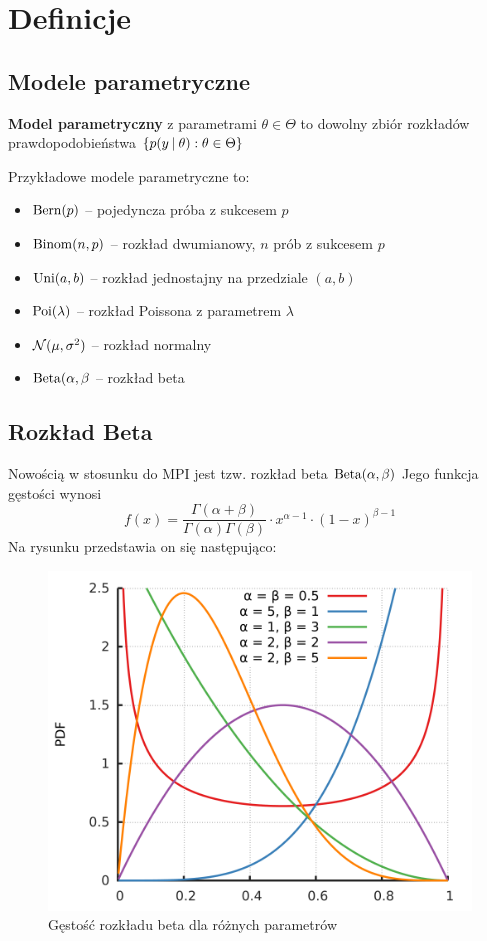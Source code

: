 \section{Definicje}

\subsection{Modele parametryczne}

\begin{definition}
	\textbf{Model parametryczny} z parametrami \( \theta \in \Theta \) to dowolny zbiór rozkładów prawdopodobieństwa \( \set{p(y \given \theta) : \theta \in \Theta} \)
\end{definition}

Przykładowe modele parametryczne to:
\begin{itemize}
	\item \(\operatorname{Bern}(p)\) -- pojedyncza próba z sukcesem \( p \)
	\item \(\operatorname{Binom}(n, p)\) -- rozkład dwumianowy, \( n \) prób z sukcesem \( p \)
	\item \(\operatorname{Uni}(a, b)\) -- rozkład jednostajny na przedziale \( (a, b) \)
	\item \(\operatorname{Poi}(\lambda)\) -- rozkład Poissona z parametrem \( \lambda \)
	\item \(\operatorname{\mathcal{N}}(\mu, \sigma^2)\) -- rozkład normalny
	\item \(\operatorname{Beta}(\alpha, \beta \) -- rozkład beta
\end{itemize}

\newpage
\subsection{Rozkład Beta}
Nowością w stosunku do MPI jest tzw. rozkład beta \( \operatorname{Beta}(\alpha, \beta) \)
Jego funkcja gęstości wynosi
\[
	f(x) = \frac{\Gamma(\alpha + \beta)}{\Gamma(\alpha)\Gamma(\beta)}
	\cdot x^{\alpha - 1}
	\cdot (1-x)^{\beta - 1}
\]
Na rysunku przedstawia on się następująco:
\begin{figure}[H]
	\centering
	\includegraphics[scale=0.25]{img/beta-distribution.png}
	\caption{Gęstość rozkładu beta dla różnych parametrów}
\end{figure}

